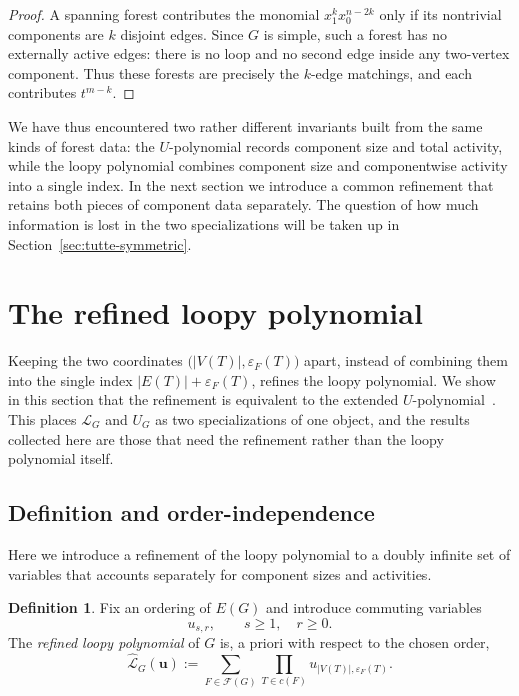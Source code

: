 \documentclass[11pt]{article}
\theoremstyle{plain}
\theoremstyle{definition}
\newtheorem{definition}[theorem]{Definition}
\renewcommand{\mathcal}{\mathscr}
\newcommand{\LL}{\mathcal{L}}    %
\newcommand{\cF}{\mathcal{F}}    %
\newcommand{\bu}{\mathbf{u}}
\newcommand{\eps}{\varepsilon}
\numberwithin{equation}{section}
\begin{document}
\begin{proof}
A spanning forest contributes the monomial $x_1^k x_0^{n-2k}$ only if its
nontrivial components are $k$ disjoint edges.  Since $G$ is simple, such a
forest has no externally active edges: there is no loop and no second edge
inside any two-vertex component.  Thus these forests are precisely the
$k$-edge matchings, and each contributes $t^{m-k}$.
\end{proof}

We have thus encountered two rather different invariants built from the
same kinds of forest data: the $U$-polynomial records component
size and total activity, while the loopy polynomial combines component
size and componentwise activity into a single index.  In the next section
we introduce a common refinement that retains both pieces of component
data separately.  The question of how much information is lost in the two
specializations will be taken up in Section~\ref{sec:tutte-symmetric}.

\section{The refined loopy polynomial}\label{sec:refined}

Keeping the two coordinates $\bigl(|V(T)|,\eps_F(T)\bigr)$ apart,
instead of combining them into the single index
$|E(T)|+\eps_F(T)$, refines the loopy polynomial.
We show in this section that the refinement is equivalent to the extended $U$-polynomial~\cite{MN}.
This places $\LL_G$ and $U_G$ as two
specializations of one object, and the results collected here are those
that need the refinement rather than the loopy polynomial itself.

\subsection{Definition and order-independence}\label{subsec:refined-loopy}

Here we introduce a refinement of the loopy polynomial to a doubly infinite set of variables that accounts separately for component sizes and activities.

\begin{definition}\label{def:refined-loopy}
Fix an ordering of $E(G)$ and introduce commuting variables
\[
   u_{s,r},\qquad s\ge 1,\quad r\ge 0.
\]
The \emph{refined loopy polynomial} of $G$ is, a priori with respect to the
chosen order,
\begin{equation}\label{eq:refined-loopy}
   \widehat{\LL}_G(\bu)
   :=
   \sum_{F\in\cF(G)}
   \prod_{T\in c(F)}
   u_{|V(T)|,\eps_F(T)}.
\end{equation}
\end{definition}
\end{document}
